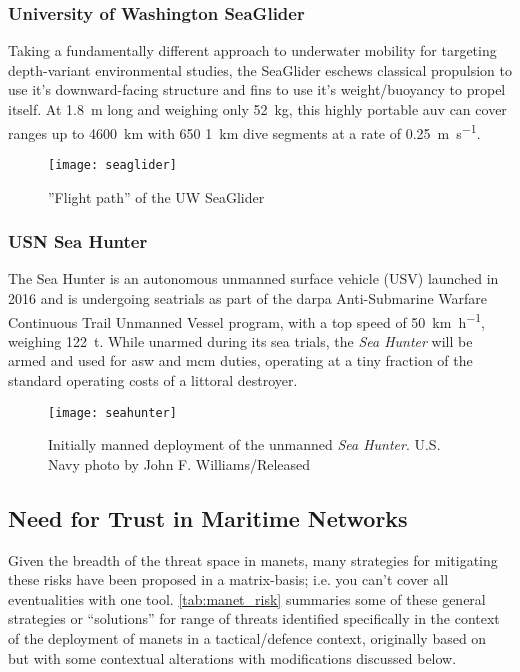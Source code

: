 \subsubsection{University of Washington SeaGlider}
Taking a fundamentally different approach to underwater mobility for targeting depth-variant environmental studies, the SeaGlider eschews classical propulsion to use it's downward-facing structure and fins to use it's weight/buoyancy to propel itself.   
At \SI{1.8}{\meter} long and weighing only \SI{52}{\kilogram}, this highly portable \gls{auv} can cover ranges up to \SI{4600}{\kilo\meter} with 650 \SI{1}{\kilo\meter} dive segments at a rate of \SI{0.25}{\meter\per\second}.
\begin{figure}[h]
	\centering
	\texttt{[image: seaglider]}
	\caption{\label{fig:seaglider}''Flight path'' of the UW SeaGlider}
\end{figure}

\subsubsection{USN Sea Hunter}
The Sea Hunter is an autonomous unmanned surface vehicle (USV) launched in 2016 and is undergoing seatrials as part of the \gls{darpa} Anti-Submarine Warfare Continuous Trail Unmanned Vessel program, with a top speed of \SI{50}{\km\per\hour}, weighing \SI{122}{\tonne}.
While unarmed during its sea trials, the \emph{Sea Hunter} will be armed and used for \gls{asw} and \gls{mcm} duties, operating at a tiny fraction of the standard operating costs of a littoral destroyer.
\begin{figure}[h]
	\centering
	\texttt{[image: seahunter]}
	\caption[Initially manned deployment of the unmanned \emph{Sea Hunter}]{\label{fig:seahunter}Initially manned deployment of the unmanned \emph{Sea Hunter}. U.S. Navy photo by John F. Williams/Released}
\end{figure}

\subsection{Need for Trust in Maritime Networks}\label{sec:trust_in_marine}


Given the breadth of the threat space in \glspl{manet}, many strategies for mitigating these risks have been proposed in a matrix-basis; i.e. you can't cover all eventualities with one tool.
\autoref{tab:manet_risk} summaries some of these general strategies or ``solutions'' for range of threats identified specifically in the context of the deployment of \glspl{manet} in a tactical/defence context, originally based on~\citet{Kidston2010} but with some contextual alterations with modifications discussed below.

